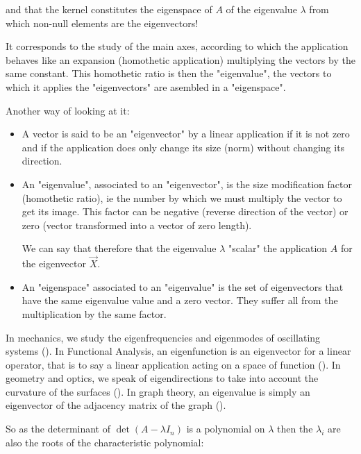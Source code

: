 	and that the kernel constitutes the eigenspace  of $A$ of the eigenvalue $\lambda$ from which non-null elements are the eigenvectors!
	
	It corresponds to the study of the main axes, according to which the application behaves like an expansion (homothetic application) multiplying the vectors by the same constant. This homothetic ratio is then the "eigenvalue", the vectors to which it applies the "eigenvectors" are asembled in a "eigenspace".
	
	Another way of looking at it:
	\begin{itemize}
		\item A vector is said to be an "eigenvector" by a linear application if it is not zero and if the application does only change its size (norm) without changing its direction.

		\item An "eigenvalue", associated to an "eigenvector", is the size modification factor (homothetic ratio), ie the number by which we must multiply the vector to get its image. This factor can be negative (reverse direction of the vector) or zero (vector transformed into a vector of zero length).
		
		We can say that therefore that the eigenvalue $\lambda$ "scalar" the application $A$ for the eigenvector $\vec{X}$.

		\item An "eigenspace" associated to an "eigenvalue" is the set of eigenvectors that have the same eigenvalue value and a zero vector. They suffer all from the multiplication by the same factor.
	\end{itemize}
	\begin{tcolorbox}[title=Remark,colframe=black,arc=10pt]
	In mechanics, we study the eigenfrequencies and eigenmodes of oscillating systems (). In Functional Analysis, an eigenfunction is an eigenvector for a linear operator, that is to say a linear application acting on a space of function (). In geometry and optics, we speak of eigendirections to take into account the curvature of the surfaces (). In graph theory, an eigenvalue is simply an eigenvector of the adjacency matrix of the graph ().
	\end{tcolorbox}So as the determinant of $\det(A-\lambda I_n)$ is a polynomial on $\lambda$ then the $\lambda_i$ are also the roots of the characteristic polynomial:
	
